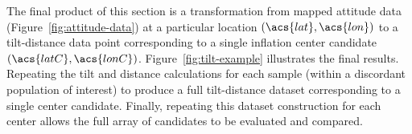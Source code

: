 The final product of this section is a transformation from mapped attitude data (Figure~\ref{fig:attitude-data}) at a particular location $(\acs{lat}, \acs{lon})$ to a tilt-distance data point corresponding to a single inflation center candidate $(\acs{latC}, \acs{lonC})$. Figure~\ref{fig:tilt-example} illustrates the final results. Repeating the tilt and distance calculations for each sample (within a discordant population of interest) to produce a full tilt-distance dataset corresponding to a single center candidate. Finally, repeating this dataset construction for each center allows the full array of candidates to be evaluated and compared.